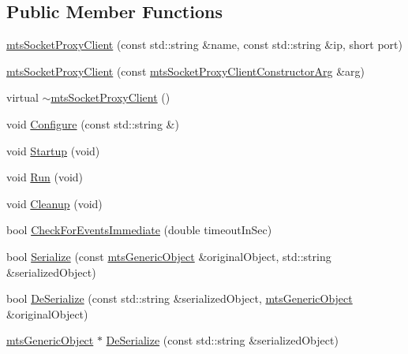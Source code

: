 \subsection*{Public Member Functions}
\begin{DoxyCompactItemize}
\item 
\hyperlink{classmts_socket_proxy_client_a9c0a9b0c6296cb0c358224264c09400a}{mts\+Socket\+Proxy\+Client} (const std\+::string \&name, const std\+::string \&ip, short port)
\item 
\hyperlink{classmts_socket_proxy_client_ac82380de41130f912f003b1631092974}{mts\+Socket\+Proxy\+Client} (const \hyperlink{classmts_socket_proxy_client_constructor_arg}{mts\+Socket\+Proxy\+Client\+Constructor\+Arg} \&arg)
\item 
virtual \hyperlink{classmts_socket_proxy_client_af612608c01a2d5d9568d7f1827008fe7}{$\sim$mts\+Socket\+Proxy\+Client} ()
\item 
void \hyperlink{classmts_socket_proxy_client_acf195f7226080220c9dc96bf7657575e}{Configure} (const std\+::string \&)
\item 
void \hyperlink{classmts_socket_proxy_client_a28558277e1f96b6cd469dcb486f2897b}{Startup} (void)
\item 
void \hyperlink{classmts_socket_proxy_client_a7a45114ab6273e061801d8610a2f0507}{Run} (void)
\item 
void \hyperlink{classmts_socket_proxy_client_af5898c763a908439e34a59cac4ae3b1a}{Cleanup} (void)
\item 
bool \hyperlink{classmts_socket_proxy_client_a275353ca488e59029ab051b033fc4379}{Check\+For\+Events\+Immediate} (double timeout\+In\+Sec)
\item 
bool \hyperlink{classmts_socket_proxy_client_a7690d30c3b85a65435911de328a5fe75}{Serialize} (const \hyperlink{classmts_generic_object}{mts\+Generic\+Object} \&original\+Object, std\+::string \&serialized\+Object)
\item 
bool \hyperlink{classmts_socket_proxy_client_ab5f6d0a8d994118897463151b664c1e8}{De\+Serialize} (const std\+::string \&serialized\+Object, \hyperlink{classmts_generic_object}{mts\+Generic\+Object} \&original\+Object)
\item 
\hyperlink{classmts_generic_object}{mts\+Generic\+Object} $\ast$ \hyperlink{classmts_socket_proxy_client_a55cd555d4b64f92c7f7f8dbfd06ef704}{De\+Serialize} (const std\+::string \&serialized\+Object)
\end{DoxyCompactItemize}
